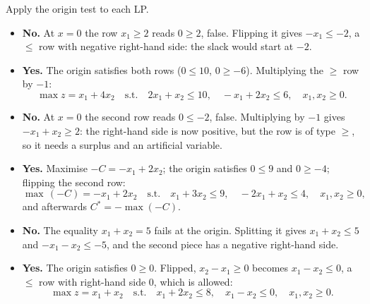 \begin{solutions}
  \item Apply the origin test to each LP.
        \begin{itemize}[leftmargin=1.6em,itemsep=0.3ex]
          \item[(a)] \textbf{No.} At $x=0$ the row $x_1\ge 2$ reads
                $0\ge 2$, false. Flipping it gives $-x_1\le -2$, a $\le$
                row with negative right-hand side: the slack would start
                at $-2$.
          \item[(b)] \textbf{Yes.} The origin satisfies both rows
                ($0\le 10$, $0\ge -6$). Multiplying the $\ge$ row by $-1$:
                \[
                  \max z=x_1+4x_2\quad\text{s.t.}\quad
                  2x_1+x_2\le 10,\quad -x_1+2x_2\le 6,\quad x_1,x_2\ge 0 .
                \]
          \item[(c)] \textbf{No.} At $x=0$ the second row reads $0\le -2$,
                false. Multiplying by $-1$ gives $-x_1+x_2\ge 2$: the
                right-hand side is now positive, but the row is of type
                $\ge$, so it needs a surplus and an artificial variable.
          \item[(d)] \textbf{Yes.} Maximise $-C=-x_1+2x_2$; the origin
                satisfies $0\le 9$ and $0\ge -4$; flipping the second row:
                \[
                  \max\,(-C)=-x_1+2x_2\quad\text{s.t.}\quad
                  x_1+3x_2\le 9,\quad -2x_1+x_2\le 4,\quad x_1,x_2\ge 0,
                \]
                and afterwards $C^{*}=-\max(-C)$.
          \item[(e)] \textbf{No.} The equality $x_1+x_2=5$ fails at the
                origin. Splitting it gives $x_1+x_2\le 5$ and
                $-x_1-x_2\le -5$, and the second piece has a negative
                right-hand side.
          \item[(f)] \textbf{Yes.} The origin satisfies $0\ge 0$. Flipped,
                $x_2-x_1\ge 0$ becomes $x_1-x_2\le 0$, a $\le$ row with
                right-hand side $0$, which is allowed:
                \[
                  \max z=x_1+x_2\quad\text{s.t.}\quad
                  x_1+2x_2\le 8,\quad x_1-x_2\le 0,\quad x_1,x_2\ge 0 .
                \]
        \end{itemize}


\end{solutions}
